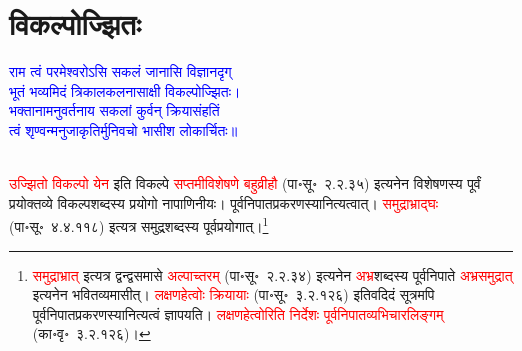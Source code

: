 \section[विकल्पोज्झितः]{विकल्पोज्झितः}
\centering\textcolor{blue}{राम त्वं परमेश्वरोऽसि सकलं जानासि विज्ञानदृग्\nopagebreak\\
भूतं भव्यमिदं त्रिकालकलनासाक्षी विकल्पोज्झितः।\nopagebreak\\
भक्तानामनुवर्तनाय सकलां कुर्वन् क्रियासंहतिं\nopagebreak\\
त्वं शृण्वन्मनुजाकृतिर्मुनिवचो भासीश लोकार्चितः॥}\nopagebreak\\
\\
\begin{sloppypar}\justifying\noindent\hspace{10mm} \textcolor{red}{उज्झितो विकल्पो येन} इति विकल्पे \textcolor{red}{सप्तमीविशेषणे बहुव्रीहौ} (पा॰सू॰~२.२.३५) इत्यनेन विशेषणस्य पूर्वं प्रयोक्तव्ये विकल्प\-शब्दस्य प्रयोगो नापाणिनीयः। पूर्व\-निपात\-प्रकरणस्यानित्यत्वात्। \textcolor{red}{समुद्राभ्राद्घः} (पा॰सू॰~४.४.११८) इत्यत्र समुद्र\-शब्दस्य पूर्व\-प्रयोगात्।\footnote{\textcolor{red}{समुद्राभ्रात्} इत्यत्र द्वन्द्व\-समासे \textcolor{red}{अल्पाच्तरम्} (पा॰सू॰~२.२.३४) इत्यनेन \textcolor{red}{अभ्र}\-शब्दस्य पूर्व\-निपाते \textcolor{red}{अभ्रसमुद्रात्} इत्यनेन भवितव्यमासीत्। \textcolor{red}{लक्षण\-हेत्वोः क्रियायाः} (पा॰सू॰~३.२.१२६) इतिवदिदं सूत्रमपि पूर्व\-निपात\-प्रकरणस्यानित्यत्वं ज्ञापयति। \textcolor{red}{लक्षण\-हेत्वोरिति निर्देशः पूर्वनिपात\-व्यभिचार\-लिङ्गम्} (का॰वृ॰~३.२.१२६)।}\end{sloppypar}
